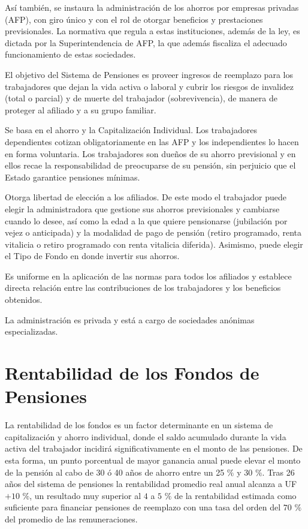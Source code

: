 As\'i tambi\'en, se instaura la administraci\'on de los ahorros por empresas privadas (AFP), con giro \'unico y con el rol de otorgar beneficios y prestaciones previsionales. La normativa que regula a estas instituciones, adem\'as de la ley, es dictada por la Superintendencia de AFP, la que adem\'as fiscaliza el adecuado funcionamiento de estas sociedades.

El objetivo del Sistema de Pensiones es proveer ingresos de reemplazo para los trabajadores que dejan la vida activa o laboral y cubrir los riesgos de invalidez (total o parcial) y de muerte del trabajador (sobrevivencia), de manera de proteger al afiliado y a su grupo familiar.

Se basa en el ahorro y la Capitalizaci\'on Individual. Los trabajadores dependientes cotizan obligatoriamente en las AFP y los independientes lo hacen en forma voluntaria. Los trabajadores son due\~nos de su ahorro previsional y en ellos recae la responsabilidad de preocuparse de su pensi\'on, sin perjuicio que el Estado garantice pensiones m\'inimas.

Otorga libertad de elecci\'on a los afiliados. De este modo el trabajador puede elegir la administradora que gestione sus ahorros previsionales y cambiarse cuando lo desee, as\'i como la edad a la que quiere pensionarse (jubilaci\'on por vejez o anticipada) y la modalidad de pago de pensi\'on (retiro programado, renta vitalicia o retiro programado con renta vitalicia diferida). Asimismo, puede elegir el Tipo de Fondo en donde invertir sus ahorros.

Es uniforme en la aplicaci\'on de las normas para todos los afiliados y establece directa relaci\'on entre las contribuciones de los trabajadores y los beneficios obtenidos.

La administraci\'on es privada y est\'a a cargo de sociedades an\'onimas especializadas.

\section{Rentabilidad de los Fondos de Pensiones}

La rentabilidad de los fondos es un factor determinante en un sistema de
capitalizaci\'on y ahorro individual, donde el saldo acumulado durante la vida
activa del trabajador incidir\'a significativamente en el monto de las pensiones.
De esta forma, un punto porcentual de mayor ganancia anual puede elevar el
monto de la pensi\'on al cabo de 30 \'o 40 a\~nos de ahorro entre un 25 $\%$ y 30 $\%$.
Tras 26 a\~nos del sistema de pensiones la rentabilidad promedio real anual
alcanza a UF $+ 10$ $\%$, un resultado muy superior al $4$ a $5$ $\%$ de la rentabilidad
estimada como suficiente para financiar pensiones de reemplazo con una tasa
del orden del $70$ $\%$ del promedio de las remuneraciones.

